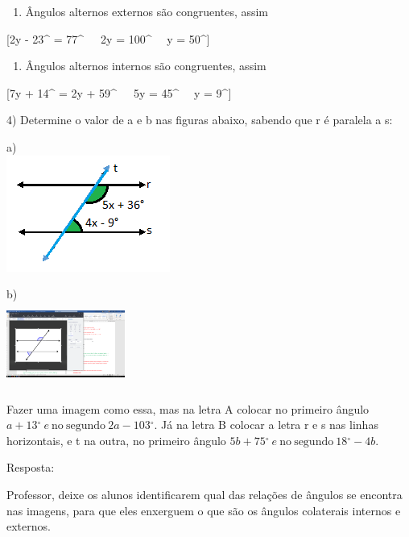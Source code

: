 \begin{enumerate}
\def\labelenumi{\alph{enumi})}
\tightlist
\item
  Ângulos alternos externos são congruentes, assim
\end{enumerate}

[2y - 23{^\circ} = 77{^\circ}\  \rightarrow \ \ 2y = 100{^\circ} \rightarrow \ \ y = 50{^\circ}]

\begin{enumerate}
\def\labelenumi{\alph{enumi})}
\setcounter{enumi}{1}
\tightlist
\item
  Ângulos alternos internos são congruentes, assim
\end{enumerate}

[7y + 14{^\circ} = 2y + 59{^\circ}\  \rightarrow \ \ 5y = 45{^\circ} \rightarrow \ \ y = 9{^\circ}]

4) Determine o valor de a e b nas figuras abaixo, sabendo que r é
paralela a s:

a)\\
\includegraphics[width=2.11458in,height=1.5in]{./imgSAEB_7_MAT/media/image45.png}

b)\\
\includegraphics[width=1.53539in,height=1.08626in]{./imgSAEB_7_MAT/media/image46.png}

Fazer uma imagem como essa, mas na letra A colocar no primeiro ângulo
\(a + 13{^\circ}\ e\ \text{no}\ \text{segundo}\ 2a - 103{^\circ}\). Já
na letra B colocar a letra r e s nas linhas horizontais, e t na outra,
no primeiro ângulo
\(5b + 75{^\circ}\ e\ \text{no}\ \text{segundo}\ 18{^\circ} - 4b.\)

Resposta:

Professor, deixe os alunos identificarem qual das relações de ângulos se
encontra nas imagens, para que eles enxerguem o que são os ângulos
colaterais internos e externos.

